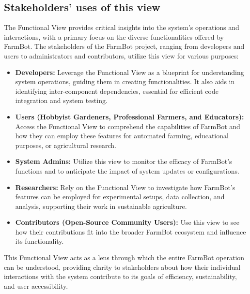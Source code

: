 \subsection{Stakeholders’ uses of this view}
The Functional View provides critical insights into the system's operations and interactions, with a primary focus on the diverse functionalities offered by FarmBot. The stakeholders of the FarmBot project, ranging from developers and users to administrators and contributors, utilize this view for various purposes:
\begin{itemize}
    \item \textbf{Developers:} Leverage the Functional View as a blueprint for understanding system operations, guiding them in creating functionalities. It also aids in identifying inter-component dependencies, essential for efficient code integration and system testing.
    \item \textbf{Users (Hobbyist Gardeners, Professional Farmers, and Educators):} Access the Functional View to comprehend the capabilities of FarmBot and how they can employ these features for automated farming, educational purposes, or agricultural research.
    \item \textbf{System Admins:} Utilize this view to monitor the efficacy of FarmBot's functions and to anticipate the impact of system updates or configurations.
    \item \textbf{Researchers:} Rely on the Functional View to investigate how FarmBot's features can be employed for experimental setups, data collection, and analysis, supporting their work in sustainable agriculture.
    \item \textbf{Contributors (Open-Source Community Users):} Use this view to see how their contributions fit into the broader FarmBot ecosystem and influence its functionality.
\end{itemize}
This Functional View acts as a lens through which the entire FarmBot operation can be understood, providing clarity to stakeholders about how their individual interactions with the system contribute to its goals of efficiency, sustainability, and user accessibility.

